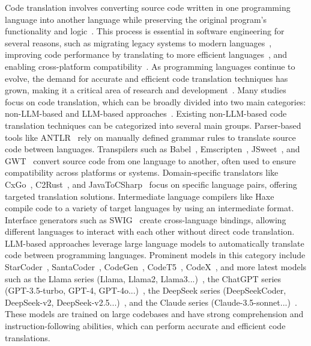 Code translation involves converting source code written in one programming language into another language while preserving the original program's functionality and logic~\cite{pan2024lost,sun2024survey,eniser2024towards,dou2024s}. This process is essential in software engineering for several reasons, such as migrating legacy systems to modern languages~\cite{nguyen2013lexical,nguyen2014migrating}, improving code performance by translating to more efficient languages~\cite{aggarwal2015using}, and enabling cross-platform compatibility~\cite{szafraniec2022code}. As programming languages continue to evolve, the demand for accurate and efficient code translation techniques has grown, making it a critical area of research and development~\cite{bahdanau2014neural, chen2018tree, artetxe2018unsupervised, devlin2018bert, feng2020codebert, guo2020graphcodebert, ahmad2021unified, guo2022unixcoder, zheng2023codegeex}. Many studies focus on code translation, which can be broadly divided into two main categories: non-LLM-based and LLM-based approaches~\cite{pan2024lost}. Existing non-LLM-based code translation techniques can be categorized into several main groups. Parser-based tools like ANTLR~\cite{ANTLR} rely on manually defined grammar rules to translate source code between languages. Transpilers such as Babel~\cite{Babel}, Emscripten~\cite{Emscripten}, JSweet~\cite{JSweet}, and GWT~\cite{GWT} convert source code from one language to another, often used to ensure compatibility across platforms or systems. Domain-specific translators like CxGo~\cite{CxGo}, C2Rust~\cite{c2rust}, and JavaToCSharp~\cite{javaTocsharp} focus on specific language pairs, offering targeted translation solutions. Intermediate language compilers like Haxe~\cite{Haxe} compile code to a variety of target languages by using an intermediate format. Interface generators such as SWIG~\cite{SWIG} create cross-language bindings, allowing different languages to interact with each other without direct code translation. LLM-based approaches leverage large language models to automatically translate code between programming languages. Prominent models in this category include StarCoder~\cite{li2023starcoder,lozhkov2024starcoder}, SantaCoder~\cite{allal2023santacoder}, CodeGen~\cite{nijkamp2022codegen}, CodeT5~\cite{wang2021codet5}, CodeX~\cite{chen2021evaluating}, and more latest models such as the Llama series (Llama, Llama2, Llama3...)~\cite{llama,llama2,llama3}, the ChatGPT series (GPT-3.5-turbo, GPT-4, GPT-4o...)~\cite{openai2023gpt4}, the DeepSeek series (DeepSeekCoder, DeepSeek-v2, DeepSeek-v2.5...)~\cite{deepseekv2}, and the Claude series (Claude-3.5-sonnet...)~\cite{Claude}. These models are trained on large codebases and have strong comprehension and instruction-following abilities, which can perform accurate and efficient code translations.


